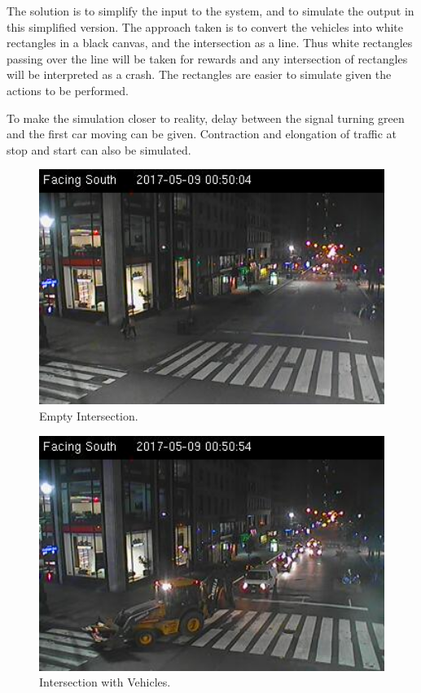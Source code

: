 \documentclass[a4paper,11pt]{article}
\begin{document}
				The solution is to simplify the input to the system, and to simulate the output in this simplified version. The approach taken is to convert the vehicles into white rectangles in a black canvas, and the intersection as a line. Thus white rectangles passing over the line will be taken for rewards and any intersection of rectangles will be interpreted as a crash. The rectangles are easier to simulate given the actions to be performed.

				To make the simulation closer to reality, delay between the signal turning green and the first car moving can be given. Contraction and elongation of traffic at stop and start can also be simulated.

				\begin{figure}[!h]
					\begin{centering}
						\includegraphics[width=15cm]{images/traffic1.png}
						\caption{Empty Intersection.}
					\end{centering}
				\end{figure}

				
				\begin{figure}[!h]
					\begin{centering}
						\includegraphics[width=15cm]{images/traffic2.png}
						\caption{Intersection with Vehicles.}
					\end{centering}
				\end{figure}
\end{document}
